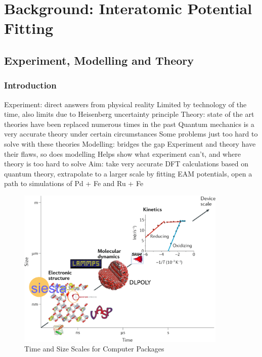 \chapter{Background: Interatomic Potential Fitting}

\begin{changemargin}{1.0cm}{1.0cm}
\end{changemargin}




\FloatBarrier
\section{Experiment, Modelling and Theory}

\FloatBarrier
\subsection{Introduction}


Experiment: direct answers from physical reality
Limited by technology of the time, also limits due to Heisenberg uncertainty principle
Theory: state of the art theories have been replaced numerous times in the past
Quantum mechanics is a very accurate theory under certain circumstances
Some problems just too hard to solve with these theories
Modelling: bridges the gap
Experiment and theory have their flaws, so does modelling
Helps show what experiment can’t, and where theory is too hard to solve
Aim: take very accurate DFT calculations based on quantum theory, extrapolate to a larger scale by fitting EAM potentials, open a path to simulations of Pd + Fe and Ru + Fe



\begin{figure}[htbp]
  \begin{center}
    \includegraphics[width=10.0cm]{chapters/background_potential_fitting/images/scale.png}
    \caption{Time and Size Scales for Computer Packages \cite{scalediagram}}
    \label{fig:electricityusagesuk}
  \end{center}
\end{figure}



